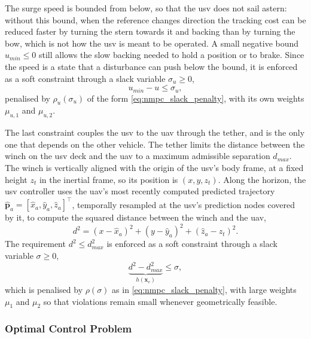 The surge speed is bounded from below, so that the \gls{usv} does not sail astern: without this bound, when the reference changes direction the tracking cost can be reduced faster by turning the stern towards it and backing than by turning the bow, which is not how the \gls{usv} is meant to be operated. A small negative bound $u_{min} \le 0$ still allows the slow backing needed to hold a position or to brake. Since the speed is a state that a disturbance can push below the bound, it is enforced as a soft constraint through a slack variable $\sigma_u \ge 0$,
\begin{equation}
    u_{min} - u \le \sigma_u,
    \label{eq:usv_mpc_surge_constraint}
\end{equation}
penalised by $\rho_u(\sigma_u)$ of the form \eqref{eq:nmpc_slack_penalty}, with its own weights $\mu_{u,1}$ and $\mu_{u,2}$.

The last constraint couples the \gls{usv} to the \gls{uav} through the tether, and is the only one that depends on the other vehicle. The tether limits the distance between the winch on the \gls{usv} deck and the \gls{uav} to a maximum admissible separation $d_{max}$. The winch is vertically aligned with the origin of the \gls{usv}'s body frame, at a fixed height $z_t$ in the inertial frame, so its position is $(x, y, z_t)$. Along the horizon, the \gls{usv} controller uses the \gls{uav}'s most recently computed predicted trajectory $\hat{\mathbf{p}}_a = [\hat x_a, \hat y_a, \hat z_a]^\top$, temporally resampled at the \gls{usv}'s prediction nodes covered by it, to compute the squared distance between the winch and the \gls{uav},
\begin{equation}
    d^2 = (x - \hat x_a)^2 + (y - \hat y_a)^2 + (\hat z_a - z_t)^2.
    \label{eq:usv_mpc_tether_distance}
\end{equation}
The requirement $d^2 \le d_{max}^2$ is enforced as a soft constraint through a slack variable $\sigma \ge 0$,
\begin{equation}
    \underbrace{d^2 - d_{max}^2}_{h(\mathbf{x}_v)} \le \sigma,
    \label{eq:usv_mpc_tether_constraint}
\end{equation}
which is penalised by $\rho(\sigma)$ as in \eqref{eq:nmpc_slack_penalty}, with large weights $\mu_1$ and $\mu_2$ so that violations remain small whenever geometrically feasible.

\subsubsection*{Optimal Control Problem}
 
